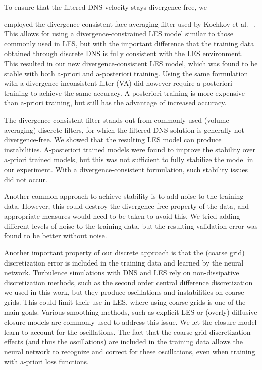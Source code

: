 \documentclass[preprint]{elsarticle}
\newcommand{\R}[1]{}
\newcommand{\revone}[1]{#1}
\newcommand{\revboth}[1]{#1}
\begin{document}
To ensure that the filtered DNS velocity stays divergence-free, we
\revone{
    \R{novel7}
    
    employed the divergence-consistent face-averaging filter used by
    Kochkov et al.~\cite{Kochkov2021}
}.
This allows for using a divergence-constrained LES model similar to those
commonly used in LES, but with the important difference that the training data
obtained through discrete DNS is fully consistent with the LES environment. This
resulted in our new divergence-consistent LES model, which was found to be
stable with both a-priori and a-posteriori training.
\revboth{Using the same formulation with a divergence-inconsistent filter (VA)
did however require a-posteriori training to achieve the same accuracy}.
A-posteriori training is more expensive than a-priori training, but still has
the advantage of increased accuracy.

\revone{\R{novel8}  The}
divergence-consistent filter stands out from commonly used
(volume-averaging) discrete filters, for which the filtered DNS solution is
generally not divergence-free. We showed that the resulting LES model can
produce instabilities. A-posteriori trained models were found to improve the
stability over a-priori trained models, but this was not sufficient to fully
stabilize the model in our experiment. With
\revone{ a divergence-consistent formulation},
such stability issues did not occur.
\revone{
    \R{noise}
    Another common approach to achieve stability is to add noise to the training
    data. However, this could destroy the divergence-free property of the data,
    and appropriate measures would need to be taken to avoid this.
    We tried adding different levels of noise to the training data, but
    the resulting validation error was found to be better without noise.
}

Another important property of our \revboth{discrete} approach is that the (coarse grid)
discretization error is included in the training data and learned by the neural
network. Turbulence simulations with DNS and LES rely on non-dissipative
discretization methods, such as the second order central difference
discretization we used in this work, but they produce oscillations and
instabilities on coarse grids. This could limit their use in LES, where using
coarse grids is one of the main goals. Various smoothing methods, such as
explicit LES or (overly) diffusive closure models are commonly used to address
this issue. We let the closure model learn to account for the oscillations. The
fact that the coarse grid discretization effects (and thus the oscillations) are
included in the training data allows the neural network to recognize and correct
for these oscillations, even when training with a-priori loss functions.
\end{document}
